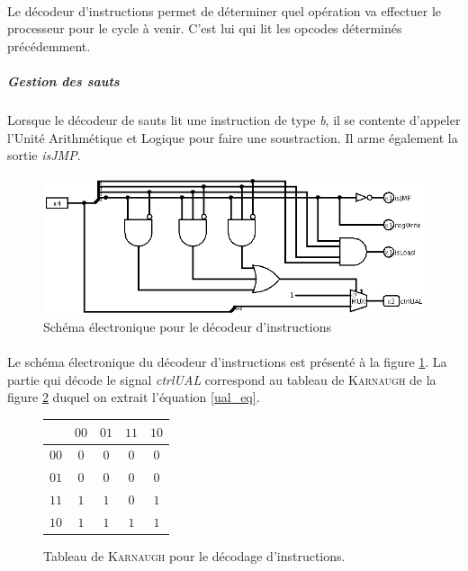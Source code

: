 \paragraph{}{
	Le décodeur d'instructions permet de déterminer quel opération va effectuer
	le processeur pour le cycle à venir. C'est lui qui lit les opcodes déterminés
	précédemment.
}
	\subparagraph{Gestion des sauts}{
		Lorsque le décodeur de sauts lit une instruction de type \textit{b},
		il se contente d'appeler l'Unité Arithmétique et Logique pour faire
		une soustraction. Il arme également la sortie \textit{isJMP}.
	}

\begin{figure}
	\centering
	\includegraphics[scale=0.4,origin=c]{circuits/deco_instru.png}
	\caption{
		\label{decod_inst_circ}
		Sch\'{e}ma \'{e}lectronique pour le d\'{e}codeur d'instructions
		}
\end{figure}

\paragraph{}{
	Le schéma électronique du décodeur d'instructions est présenté à la figure
	\ref{decod_inst_circ}. La partie qui décode le signal \textit{ctrlUAL} 
	correspond au tableau de \textsc{Karnaugh} de la figure 
	\ref{decod_ctrlual_karnaugh} duquel on extrait l'équation \ref{ual_eq}.
}


\begin{figure}
	\begin{center}
	\centering
	\begin{tabular}{|c|c|c|c|c|}
		\hline
		\backslashbox{$b_{3}b_{2}$}{$b_{1}b_{0}$} & $00$ & $01$ & $11$ & $10$ \\ 
		\hline 
		$00$ & $0$ & $0$ & $0$ & $0$ \\ 
		\hline 
		$01$ & $0$ & $0$ & $0$ & $0$ \\ 
		\hline 
		$11$ & $1$ & $1$ & $0$ & $1$ \\ 
		\hline 
		$10$ & $1$ & $1$ & $1$ & $1$ \\ 
		\hline 
	\end{tabular} 
	\end{center}
	\caption{
		\label{decod_ctrlual_karnaugh}
		Tableau de \textsc{Karnaugh} pour le décodage d'instructions.
	}
\end{figure}

